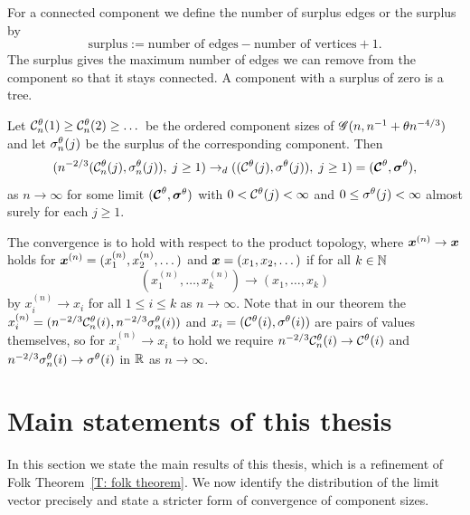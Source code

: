 For a connected component we define the number of surplus edges or the surplus by
\begin{equation}
	\text{surplus} := \text{number of edges} - \text{number of vertices} + 1.
\end{equation}
The surplus gives the maximum number of edges we can remove from the component so that it stays connected.
A component with a surplus of zero is a tree.

\begin{folktheorem} \label{T: folk theorem}
	Let $\mathcal{C}^{\theta}_n(1) \geq \mathcal{C}^{\theta}_n(2) \geq \dots$ be the ordered component sizes of 
	$\mathscr{G}(n, n^{-1} + \theta n^{-4 / 3})$ and let $\mathcal{\sigma}^{\theta}_n(j)$ be the surplus of the corresponding component.
	Then
	\begin{equation}
		( n^{-2 / 3} ( \mathcal{C}^{\theta}_n(j), \mathcal{\sigma}^{\theta}_n(j) ), \; j \geq 1 ) 
		\rightarrow_d
		( (\mathcal{C}^{\theta}(j), \mathcal{\sigma}^{\theta}(j)), \; j \geq 1 )
		= ( \boldsymbol{\mathcal{C}}^{\theta}, \boldsymbol{\mathcal{\sigma}}^{\theta} ),
	\end{equation}
	as $n \rightarrow \infty$ for some limit $( \boldsymbol{\mathcal{C}}^{\theta}, \boldsymbol{\mathcal{\sigma}}^{\theta} )$
	with $0 < \mathcal{C}^{\theta}(j) < \infty$ and $0 \leq \mathcal{\sigma}^{\theta}(j) < \infty$ almost surely for each $j \geq 1$.
\end{folktheorem}

The convergence is to hold with respect to the product topology, 
where $\boldsymbol{x}^{(n)} \rightarrow \boldsymbol{x}$ holds for $\boldsymbol{x}^{(n)} = (x^{(n)}_1, x^{(n)}_2, \dots)$ and $\boldsymbol{x} = (x_1, x_2, \dots)$
if for all $k \in \mathbb{N}$
\begin{equation*}
	(x^{(n)}_1, \dots, x^{(n)}_k) \rightarrow (x_1, \dots,  x_k)
\end{equation*}
by $x^{(n)}_i \rightarrow x_i$ for all $1 \leq i \leq k$ as $n \rightarrow \infty$.
Note that in our theorem the $x^{(n)}_i = ( n^{-2 / 3} \mathcal{C}^{\theta}_n(i), n^{-2 / 3} \mathcal{\sigma}^{\theta}_n(i))$ and $x_i = (\mathcal{C}^{\theta}(i), \mathcal{\sigma}^{\theta}(i))$ are pairs of values themselves,
so for $x^{(n)}_i \rightarrow x_i$ to hold we require 
$n^{-2 / 3}  \mathcal{C}^{\theta}_n(i) \rightarrow \mathcal{C}^{\theta}(i)$ and $n^{-2 / 3} \mathcal{\sigma}^{\theta}_n(i) \rightarrow \mathcal{\sigma}^{\theta}(i)$ 
in $\mathbb{R}$ as $n \rightarrow \infty$.


\section{Main statements of this thesis}

In this section we state the main results of this thesis,
which is a refinement of Folk Theorem~\ref{T: folk theorem}.
We now identify the distribution of the limit vector precisely and state a stricter form of convergence of component sizes.

